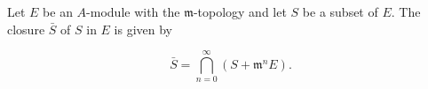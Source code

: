 Let $E$ be an $A$-module with the $\mathfrak{m}$-topology and let $S$ be a subset of $E$. The closure $\bar{S}$ of $S$ in $E$ is given by

$$\bar{S} = \bigcap_{n=0}^{\infty} (S + \mathfrak{m}^n E).$$